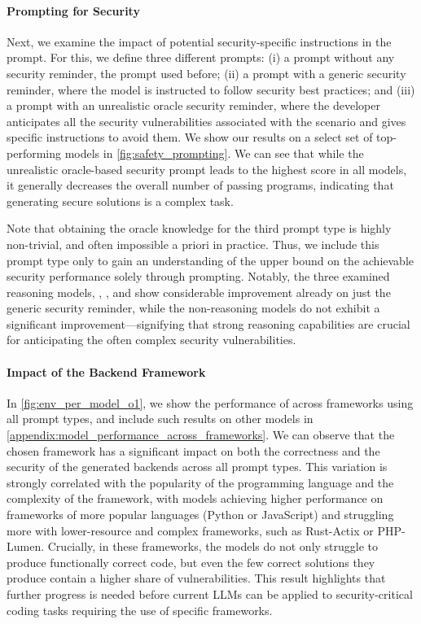 \paragraph{Prompting for Security}
Next, we examine the impact of potential security-specific instructions in the prompt. For this, we define three different prompts: (i) a prompt without any security reminder, \ie the prompt used before; (ii) a prompt with a generic security reminder, where the model is instructed to follow security best practices; and (iii) a prompt with an unrealistic oracle security reminder, where the developer anticipates all the security vulnerabilities associated with the scenario and gives specific instructions to avoid them.
We show our results on a select set of top-performing models in \cref{fig:safety_prompting}.
We can see that while the unrealistic oracle-based security prompt leads to the highest  score in all models, it generally decreases the overall number of passing programs, indicating that generating secure solutions is a complex task.

Note that obtaining the oracle knowledge for the third prompt type is highly non-trivial, and often impossible a priori in practice. Thus, we include this prompt type only to gain an understanding of the upper bound on the achievable security performance solely through prompting.
Notably, the three examined reasoning models, \openaione{}, \openaiothree{}, and \dsro{} show considerable improvement already on just the generic security reminder, while the non-reasoning models do not exhibit a significant improvement---signifying that strong reasoning capabilities are crucial for anticipating the often complex security vulnerabilities.

\paragraph{Impact of the Backend Framework}
In \cref{fig:env_per_model_o1}, we show the performance of \openaione{} across frameworks using all prompt types, and include such results on other models in \cref{appendix:model_performance_across_frameworks}.
We can observe that the chosen framework has a significant impact on both the correctness and the security of the generated backends across all prompt types.
This variation is strongly correlated with the popularity of the programming language and the complexity of the framework, with models achieving higher performance on frameworks of more popular languages (\eg Python or JavaScript) and struggling more with lower-resource and complex frameworks, such as Rust-Actix or PHP-Lumen. Crucially, in these frameworks, the models do not only struggle to produce functionally correct code, but even the few correct solutions they produce contain a higher share of vulnerabilities.
This result highlights that further progress is needed before current LLMs can be applied to security-critical coding tasks requiring the use of specific frameworks.

